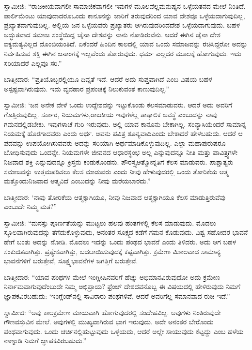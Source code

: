\eject

ಸ್ವಾಮೀಜಿ: “ರಾಜಕೀಯವಾಗಲೀ ಸಾಮಾಜಿಕವಾಗಲೀ ಇವುಗಳ ಮೂಲವೆಲ್ಲ\break ಮನುಷ್ಯನ ಒಳ್ಳೆಯತನದ ಮೇಲೆ ನಿಂತಿದೆ. ಪಾರ್ಲಿಮೆಂಟು ಯಾವುದಾದರೂ\break ಒಂದು ಕಾನೂನನ್ನು ಜಾರಿಗೆ ತರುವುದರಿಂದ ಯಾವ ದೇಶವೂ ಒಳ್ಳೆಯದಾಗುವುದಿಲ್ಲ, ಪ್ರಖ್ಯಾತವಾಗುವುದಿಲ್ಲ. ಅಲ್ಲಿಯ ಜನ ಒಳ್ಳೆಯವರು ಪ್ರಖ್ಯಾತರು ಆಗಿರುವುದರಿಂದ\break ದೇಶ ಒಳ್ಳೆಯದಾಗುವುದು. ಬಹಳ ಅದ್ಭುತವಾದ ಸಮಾಜ ಸಂಸ್ಥೆಯಿದ್ದ ಚೈನಾ ದೇಶವನ್ನು ನಾನು ನೋಡಿರುವೆನು. ಆದರೆ ಈಗಿನ ಚೈನಾ ದೇಶ ಐಕ್ಯಮತ್ಯವಿಲ್ಲದ ದೊಂಬಿಯಂತಿದೆ. ಏಕೆಂದರೆ ಹಿಂದಿನ ಕಾಲದಲ್ಲಿ ಯಾವ ಒಂದು ಸಮಾಜವನ್ನು ರಚಿಸಿದ್ದರೋ ಅದನ್ನು ನಿರ್ವಹಿಸುವ ಶಕ್ತಿ ಈಗಿನ ಜನಾಂಗಕ್ಕೆ ಇಲ್ಲವೆಂದು ತೋರುವುದು. ಧರ್ಮ ಎಲ್ಲದರ ಮೂಲಕ್ಕೆ ಹೋಗುವುದು. ಇದು ಸರಿಯಾದರೆ ಎಲ್ಲವೂ ಸರಿ.”

ಬಾತ್ಮೀದಾರ: “ಪ್ರತಿಯೊಬ್ಬರಲ್ಲಿಯೂ ದಿವ್ಯತೆ ಇದೆ. ಆದರೆ ಅದು ಸುಪ್ತವಾಗಿದೆ ಎಂಬ ವಿಷಯ ಬಹಳ ಅಸ್ಪಷ್ಟವಾಗಿರುವುದು. ಇದು ವ್ಯವಹಾರ ಪ್ರಪಂಚಕ್ಕೆ ನಿಲುಕುವಂತೆ ಕಾಣುವುದಿಲ್ಲ.”

ಸ್ವಾಮೀಜಿ: ‘ಜನ ಅನೇಕ ವೇಳೆ ಒಂದು ಉದ್ದೇಶವನ್ನು ಇಟ್ಟುಕೊಂಡು ಕೆಲಸ\break ಮಾಡುವರು. ಆದರೆ ಅದು ಅವರಿಗೆ ಗೊತ್ತಿರುವುದಿಲ್ಲ. ಸರ್ಕಾರ, ನಿಯಮಗಳು,\break ರಾಜಕೀಯ ಇವುಗಳೆಲ್ಲ ತಾತ್ಕಾಲಿಕ ಅವಸ್ಥೆ ಎಂಬುದನ್ನು ನಾವು ಗಮನದಲ್ಲಿಡಬೇಕು. ಇವುಗಳಾಚೆ ಗುರಿ ಇರುವುದು. ಅಲ್ಲಿ ಯಾವ ಕಾನೂನು ಬೇಕಾಗಿಲ್ಲ. ಸಂನ್ಯಾಸಿಯೆಂದರೆ ಸಾಮಾನ್ಯ ನಿಯಮಕ್ಕೆ ಹೊರಗಾದವರು ಎಂದು ಅರ್ಥ. ಅವನು ಪವಿತ್ರ ಶೂನ್ಯವಾದಿ\break ಎಂದು ಬೇಕಾದರೆ ಹೇಳಬಹುದು. ಆದರೆ ಆ ಪದವನ್ನು ಉಪಯೋಗಿಸುವವರು ಅದನ್ನು ಸರಿಯಾಗಿ ಅರ್ಥಮಾಡಿಕೊಳ್ಳುವುದಿಲ್ಲ. ಎಲ್ಲಾ ಮಹಾಪುರುಷರೂ ಬೋಧಿಸುವುದು ಒಂದನ್ನೇ. ನಿಯಮಗಳೇ ಜೀವನದ ಆಧಾರಸ್ಥಂಭ ಅಲ್ಲ ಎನ್ನುವುದನ್ನೂ ನೀತಿ ಮತ್ತು ಪಾವಿತ್ರ್ಯಗಳೇ ನಿಜವಾದ ಶಕ್ತಿ ಎನ್ನುವುದನ್ನೂ ಕ್ರಿಸ್ತನು ಕಂಡುಕೊಂಡನು. ಪೌರಸ್ತ್ಯ\break ಆತ್ಮೋನ್ನತಿಗೆ ಕೆಲಸ ಮಾಡುವರು. ಪಾಶ್ಚಾತ್ಯರು ಸಮಾಜವನ್ನು ಉತ್ತಮಪಡಿಸಲು ಕೆಲಸ ಮಾಡುವರು ಎಂದು ನೀವು ಹೇಳುವುದರಲ್ಲಿ ಒಂದು ತೋರಿಕೆಯ ಆತ್ಮ ಮತ್ತೊಂದು\break ನಿಜವಾದ ಆತ್ಮವಿದೆ ಎಂಬುದನ್ನು ನೀವು ಮರೆಯಬಾರದು.”

ಬಾತ್ಮೀದಾರ: ‘ನಾವು ತೋರಿಕೆಯ ಆತ್ಮಕ್ಕಾಗಿಯೂ, ನೀವು ನಿಜವಾದ ಆತ್ಮಕ್ಕಾಗಿಯೂ ಕೆಲಸ ಮಾಡುತ್ತಿರುವೆವು ಎಂಬುದೇ ನಿಮ್ಮ ಮತ?”

ಸ್ವಾಮೀಜಿ: “ಮನಸ್ಸು ಪೂರ್ಣತೆಯನ್ನು ಮುಟ್ಟಲು ಹಲವು ಹಂತಗಳಲ್ಲಿ ಕೆಲಸ ಮಾಡುವುದು. ಮೊದಲು ಸ್ಥೂಲವಾಗಿರುವುದನ್ನು ತೆಗೆದುಕೊಳ್ಳುವುದು, ಅನಂತರ ಸೂಕ್ಷ್ಮದ ಕಡೆಗೆ ಗಮನ ಕೊಡುವುದು. ವಿಶ್ವ ಸಹೋದರ ಭಾವನೆ ಹೇಗೆ ಬಂತು ಅದನ್ನು ನೋಡಿ. ಮೊದಲು ಇದನ್ನು ಒಂದು ಪಂಥದ ಭಾವನೆ ಎಂದು ತಿಳಿದರು. ಅದು ಆಗ ಬಹಳ ಸಂಕುಚಿತವಾಗಿತ್ತು. ಪ್ರತ್ಯೇಕವಾಗಿತ್ತು, ಬದಲಾಯಿಸುವುದಕ್ಕೆ ಕಷ್ಟವಾಗಿತ್ತು. ಕ್ರಮೇಣ ವಿಶಾಲವಾದ ಸಾಮಾನ್ಯ ಭಾವನೆಗಳಿಗೆ ಬರುತ್ತೇವೆ, ಸೂಕ್ಷ್ಮಭಾವನೆಗಳ ಜಗತ್ತಿಗೆ ಬರುತ್ತೇವೆ.

ಬಾತ್ಮೀದಾರ: “ಯಾವ ಪಂಥಗಳ ಮೇಲೆ ಇಂಗ್ಲೀಷಿನವರಿಗೆ ಹೆಚ್ಚು ಅಭಿಮಾನ\-ವಿರುವುದೋ ಅದು ಕ್ರಮೇಣ ನಿರ್ನಾಮವಾಗುವುದೆಂಬುದೇ ನಿಮ್ಮ ಅಭಿಪ್ರಾಯ? ಫ್ರೆಂಚ್​ ದೇಶದವನೊಬ್ಬ ಈ ವಿಷಯದಲ್ಲಿ ಹೇಳಿರುವುದು ನಿಮಗೆ ಜ್ಞಾಪಕವಿರಬಹುದು: ‘ಇಂಗ್ಲೆಂಡ್​ನಲ್ಲಿ ಸಾವಿರಾರು ಪಂಥಗಳಿವೆ, ಆದರೆ ಅವರಿಗೆಲ್ಲ ಸಮಾನವಾದ ರುಚಿ ಇದೆ.”

ಸ್ವಾಮೀಜಿ: “ಅವು ಕಾಲಕ್ರಮೇಣ ಮಾಯವಾಗಿ ಹೋಗುವುದರಲ್ಲಿ ಸಂದೇಹವಿಲ್ಲ. ಅವುಗಳು ನಿಂತಿರುವುದೇ ಗೌಣವಸ್ತುವಿನ ಮೇಲೆ. ಅವುಗಳಲ್ಲಿ ಮುಖ್ಯವಾಗಿರುವ ಭಾಗ ಇರುವುದು. ಅದೇ ಅನಂತರ ಬೇರೊಂದು ಪಂಥವಾಗುವುದು. ಒಂದು ಚರ್ಚಿನಲ್ಲಿ\break ಹುಟ್ಟುವುದು ಒಳ್ಳೆಯದು, ಆದರೆ ಅಲ್ಲೇ ಸಾಯುವುದು ಕೆಟ್ಟದ್ದು ಎಂಬ ಹಳೆಯ ನಾಣ್ನುಡಿ ನಿಮಗೆ ಜ್ಞಾಪಕವಿರಬಹುದು.”

